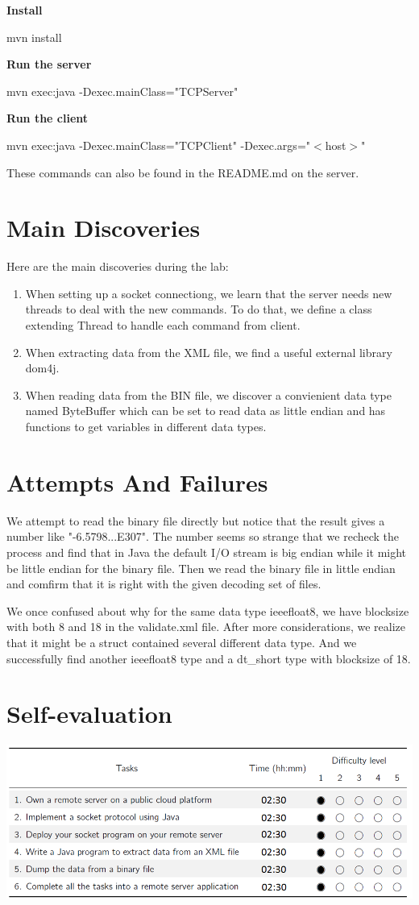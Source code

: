 \documentclass[a4paper,12pt]{article}
\begin{document}
	\textbf{Install} 
	
	mvn install
	
	\textbf{Run the server} 
	
	mvn exec:java -Dexec.mainClass="TCPServer"
	
	\textbf{Run the client} 
	
	mvn exec:java -Dexec.mainClass="TCPClient" -Dexec.args="$ < $host$ > $"
	
	These commands can also be found in the README.md on the server.
	
	\section{Main Discoveries}
	Here are the main discoveries during the lab:
	\begin{enumerate}
		\item When setting up a socket connectiong, we learn that the server needs new threads to deal with the new commands. To do that, we define a class extending Thread to handle each command from client. 
		\item When extracting data from the XML file, we find a useful external library dom4j. 
		\item When reading data from the BIN file, we discover a convienient data type named ByteBuffer which can be set to read data as little endian and has functions to get variables in different data types. 
	\end{enumerate}
	
	
	
	\section{Attempts And Failures}
	We attempt to read the binary file directly but notice that the result gives a number like "-6.5798...E307". The number seems so strange that we recheck the process and find that in Java the default I/O stream is big endian while it might be little endian for the binary file. Then we read the binary file in little endian and comfirm that it is right with the given decoding set of files. 
	
	We once confused about why for the same data type ieeefloat8, we have blocksize with both 8 and 18 in the validate.xml file. After more considerations, we realize that it might be a struct contained several different data type. And we successfully find another ieeefloat8 type and a dt\_short type with blocksize of 18.  
	
	\section{Self-evaluation}
	\includegraphics[scale = 0.7]{evaluation}
	
\end{document}
